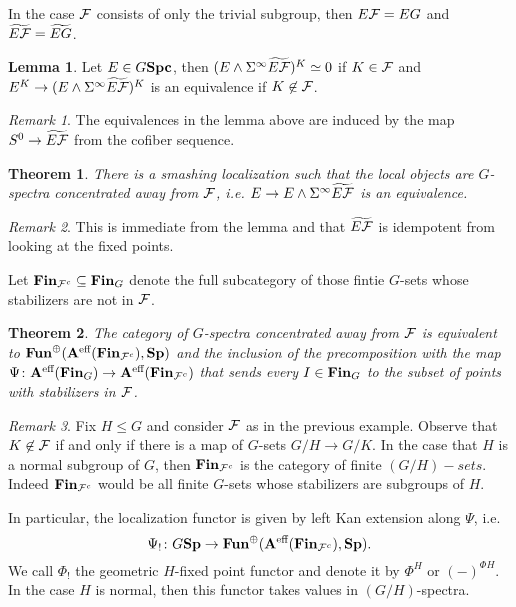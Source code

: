 \documentclass[letterpaper]{article}
\theoremstyle{definition}
\newtheorem{lemma}{Lemma}
\theoremstyle{remark}
\newtheorem{remark}{Remark}
\theoremstyle{plain}
\newtheorem{theorem}{Theorem}
\begin{document}
In the case $\mathcal{F}$ consists of only the trivial subgroup, then $E\mathcal{F} = EG$ and $\widetilde{E\mathcal{F}}=\widetilde{EG}$. 

\begin{lemma}
		Let $E\in G\mathbf{Spc}$, then $(E\wedge\Sigma^\infty\widetilde{E\mathcal{F}})^K \simeq 0$ if $K\in\mathcal{F}$ and $E^K\rightarrow(E\wedge\Sigma^\infty\widetilde{E\mathcal{F}})^K$ is an equivalence if $K\not\in\mathcal{F}$.  
\end{lemma}

\begin{remark}
		The equivalences in the lemma above are induced by the map $S^0\rightarrow\widetilde{E\mathcal{F}}$ from the cofiber sequence.
\end{remark}

\begin{theorem}
		There is a smashing localization such that the local objects are $G$-spectra concentrated away from $\mathcal{F}$, i.e. $E\rightarrow E\wedge\Sigma^\infty\widetilde{E\mathcal{F}}$ is an equivalence.
\end{theorem}

\begin{remark}
		This is immediate from the lemma and that $\widetilde{E\mathcal{F}}$ is idempotent from looking at the fixed points.
\end{remark}

Let $\mathbf{Fin}_{\mathcal{F}^c}\subseteq\mathbf{Fin}_G$ denote the full subcategory of those fintie $G$-sets whose stabilizers are not in $\mathcal{F}$.

\begin{theorem}
		The category of $G$-spectra concentrated away from $\mathcal{F}$ is equivalent to $\mathbf{Fun}^\oplus(\mathbf{A}^\textnormal{eff}(\mathbf{Fin}_{\mathcal{F}^c}),\mathbf{Sp})$ and the inclusion of the precomposition with the map $\Psi\colon\mathbf{A}^\textnormal{eff}(\mathbf{Fin}_G)\rightarrow\mathbf{A}^\textnormal{eff}(\mathbf{Fin}_{\mathcal{F}^c})$ that sends every $I\in\mathbf{Fin}_G$ to the subset of points with stabilizers in $\mathcal{F}$.
\end{theorem}

\begin{remark}
		Fix $H\leq G$ and consider $\mathcal{F}$ as in the previous example. Observe that $K\not\in\mathcal{F}$ if and only if there is a map of $G$-sets $G/H\rightarrow G/K$. In the case that $H$ is a normal subgroup of $G$, then $\mathbf{Fin}_{\mathcal{F}^c}$ is the category of finite $(G/H)-sets$. Indeed $\mathbf{Fin}_{\mathcal{F}^c}$ would be all finite $G$-sets whose stabilizers are subgroups of $H$.
\end{remark}

In particular, the localization functor is given by left Kan extension along $\Psi$, i.e.
$$\Psi_!\colon G\mathbf{Sp}\rightarrow\mathbf{Fun}^\oplus(\mathbf{A}^\textnormal{eff}(\mathbf{Fin}_{\mathcal{F}^c}),\mathbf{Sp}).$$
We call $\Phi_!$ the geometric $H$-fixed point functor and denote it by $\Phi^H$ or $(-)^{\Phi H}$. In the case $H$ is normal, then this functor takes values in $(G/H)$-spectra.
\end{document}

